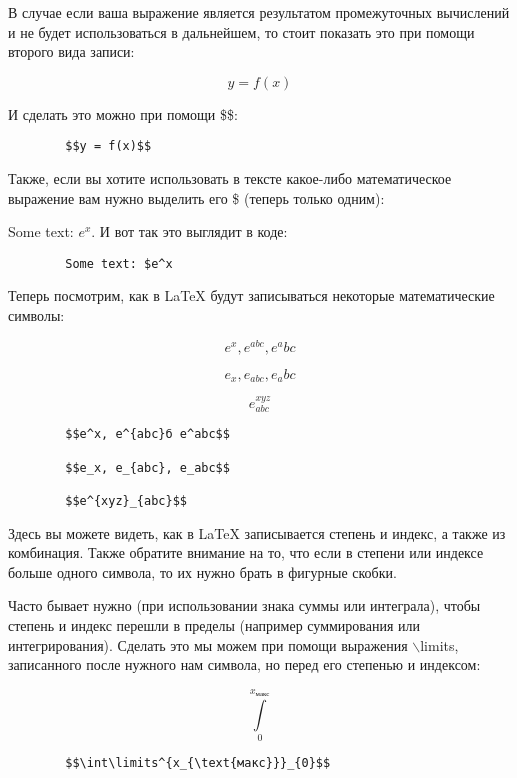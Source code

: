     В случае если ваша выражение является результатом промежуточных вычислений и не будет использоваться в дальнейшем, то стоит показать это при помощи второго вида записи:
    
    $$y = f(x)$$    
    
    И сделать это можно при помощи \$\$:    
    
    \begin{verbatim}
        $$y = f(x)$$
    \end{verbatim}
    
    Также, если вы хотите использовать в тексте какое-либо математическое выражение вам нужно выделить его \$ (теперь только одним):

    Some text: $e^x$. И вот так это выглядит в коде:
    
    \begin{verbatim}
        Some text: $e^x
    \end{verbatim}
    
    Теперь посмотрим, как в \LaTeX{} будут записываться некоторые математические символы:
    
    $$e^x, e^{abc}, e^abc$$
        
    $$e_x, e_{abc}, e_abc$$
    
    $$e^{xyz}_{abc}$$
    
    \begin{verbatim}
        $$e^x, e^{abc}б e^abc$$
        
        $$e_x, e_{abc}, e_abc$$
        
        $$e^{xyz}_{abc}$$
    \end{verbatim} 
    
    Здесь вы можете видеть, как в \LaTeX{} записывается степень и индекс, а также из комбинация. Также обратите внимание на то, что если в степени или индексе больше одного символа, то их нужно брать в фигурные скобки.
    
    Часто бывает нужно (при использовании знака суммы или интеграла), чтобы степень и индекс перешли в пределы (например суммирования или интегрирования). Сделать это мы можем при помощи выражения $\backslash$limits, записанного после нужного нам символа, но перед его степенью и индексом:
    
    $$\int\limits^{x_{\text{макс}}}_{0}$$
    
    \begin{verbatim}
        $$\int\limits^{x_{\text{макс}}}_{0}$$
    \end{verbatim}
    
